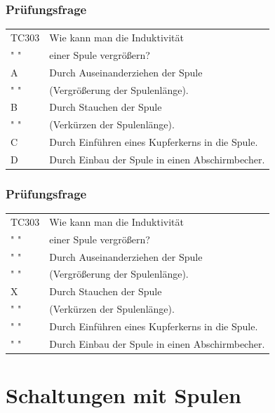 \begin{frame}
    \frametitle{Prüfungsfrage}

    \begin{center}
    \begin{tabular}{l||l}\hline
        TC303 & Wie kann man die Induktivität\\
         " "  & einer Spule vergrößern?\\\hline\hline
        A & Durch Auseinanderziehen der Spule \\
        " " & (Vergrößerung der Spulenlänge). \\ \hline
    	B & Durch Stauchen der Spule \\
        " " & (Verkürzen der Spulenlänge). \\ \hline
        C &  Durch Einführen eines Kupferkerns in die Spule. \\ \hline
        D & Durch Einbau der Spule in einen Abschirmbecher. \\ \hline
    \end{tabular}
 	    \end{center}
\end{frame}

\begin{frame}
    \frametitle{Prüfungsfrage}

    \begin{center}
    \begin{tabular}{l||l}\hline
        TC303 & Wie kann man die Induktivität\\
         " "  & einer Spule vergrößern?\\\hline\hline
        " " & Durch Auseinanderziehen der Spule \\
        " " & (Vergrößerung der Spulenlänge). \\ \hline
    	X & Durch Stauchen der Spule \\
        " " & (Verkürzen der Spulenlänge). \\ \hline
        " " &  Durch Einführen eines Kupferkerns in die Spule. \\ \hline
        " " & Durch Einbau der Spule in einen Abschirmbecher. \\ \hline
    \end{tabular}
 	    \end{center}
\end{frame}

\section*{Schaltungen mit Spulen}

